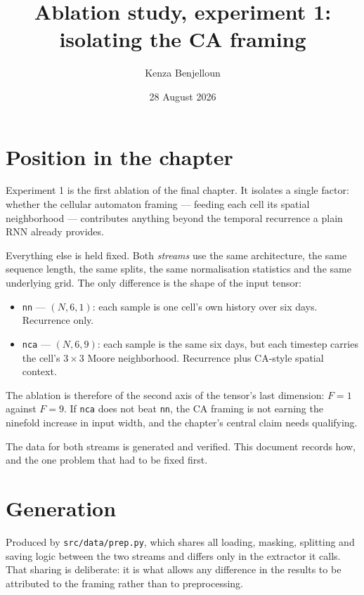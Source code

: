 \documentclass[11pt]{amsart}
\title{Ablation study, experiment 1: isolating the CA framing}
\author{Kenza Benjelloun}
\date{28 August 2026}
\begin{document}
\maketitle

\section{Position in the chapter}

Experiment 1 is the first ablation of the final chapter. It isolates a single
factor: whether the cellular automaton framing --- feeding each cell its
spatial neighborhood --- contributes anything beyond the temporal recurrence a
plain RNN already provides.

Everything else is held fixed. Both \emph{streams} use the same architecture, the same
sequence length, the same splits, the same normalisation statistics and the
same underlying grid. The only difference is the shape of the input tensor:

\begin{itemize}
  \item \texttt{nn} --- $(N, 6, 1)$: each sample is one cell's own history
    over six days. Recurrence only.
  \item \texttt{nca} --- $(N, 6, 9)$: each sample is the same six days, but
    each timestep carries the cell's $3 \times 3$ Moore neighborhood.
    Recurrence plus CA-style spatial context.
\end{itemize}

The ablation is therefore of the second axis of the tensor's last dimension:
$F = 1$ against $F = 9$. If \texttt{nca} does not beat \texttt{nn}, the CA
framing is not earning the ninefold increase in input width, and the chapter's
central claim needs qualifying.

The data for both streams is generated and verified. This document records how,
and the one problem that had to be fixed first.

\section{Generation}

Produced by \texttt{src/data/prep.py}, which shares all loading, masking,
splitting and saving logic between the two streams and differs only in the
extractor it calls. That sharing is deliberate: it is what allows any
difference in the results to be attributed to the framing rather than to
preprocessing.
\end{document}
